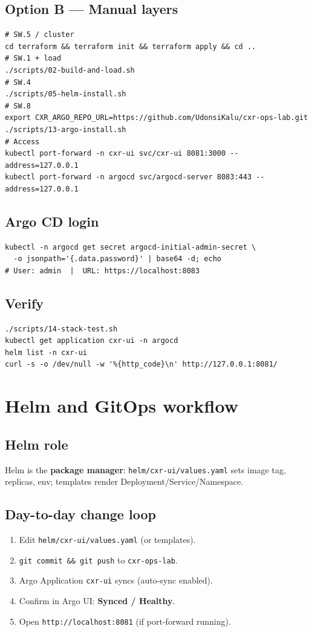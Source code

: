 \documentclass[11pt,a4paper]{report}
\begin{document}
\section{Option B --- Manual layers}
\begin{lstlisting}[style=bash]
# SW.5 / cluster
cd terraform && terraform init && terraform apply && cd ..
# SW.1 + load
./scripts/02-build-and-load.sh
# SW.4
./scripts/05-helm-install.sh
# SW.8
export CXR_ARGO_REPO_URL=https://github.com/UdonsiKalu/cxr-ops-lab.git
./scripts/13-argo-install.sh
# Access
kubectl port-forward -n cxr-ui svc/cxr-ui 8081:3000 --address=127.0.0.1
kubectl port-forward -n argocd svc/argocd-server 8083:443 --address=127.0.0.1
\end{lstlisting}

\section{Argo CD login}
\begin{lstlisting}[style=bash]
kubectl -n argocd get secret argocd-initial-admin-secret \
  -o jsonpath='{.data.password}' | base64 -d; echo
# User: admin  |  URL: https://localhost:8083
\end{lstlisting}

\section{Verify}
\begin{lstlisting}[style=bash]
./scripts/14-stack-test.sh
kubectl get application cxr-ui -n argocd
helm list -n cxr-ui
curl -s -o /dev/null -w '%{http_code}\n' http://127.0.0.1:8081/
\end{lstlisting}

\chapter{Helm and GitOps workflow}

\section{Helm role}
Helm is the \textbf{package manager}: \texttt{helm/cxr-ui/values.yaml} sets image tag, replicas, env; templates render Deployment/Service/Namespace.

\section{Day-to-day change loop}
\begin{enumerate}
  \item Edit \texttt{helm/cxr-ui/values.yaml} (or templates).
  \item \texttt{git commit \&\& git push} to \texttt{cxr-ops-lab}.
  \item Argo Application \texttt{cxr-ui} syncs (auto-sync enabled).
  \item Confirm in Argo UI: \textbf{Synced / Healthy}.
  \item Open \texttt{http://localhost:8081} (if port-forward running).
\end{enumerate}
\end{document}
